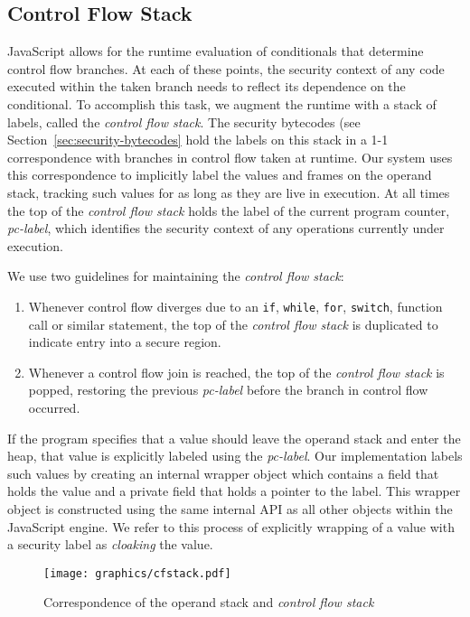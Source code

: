 \documentclass{llncs}
\begin{document}
\subsection{Control Flow Stack}
\label{sec:control-flow-stack}
JavaScript allows for the runtime evaluation of conditionals that determine control flow branches.
At each of these points, the security context of any code executed within the taken branch needs to reflect its dependence on the conditional.
To accomplish this task, we augment the runtime with a stack of labels, called the \textit{control flow stack}.
The security bytecodes (see Section~\ref{sec:security-bytecodes} hold the labels on this stack in a 1-1 correspondence with branches in control flow taken at runtime.
Our system uses this correspondence to implicitly label the values and frames on the operand stack, tracking such values for as long as they are live in execution.
At all times the top of the \textit{control flow stack} holds the label of the current program counter, \textit{pc-label}, which identifies the security context of any operations currently under execution.

We use two guidelines for maintaining the \textit{control flow stack}:
\begin{enumerate}
 \item Whenever control flow diverges due to an \texttt{if}, \texttt{while}, \texttt{for}, \texttt{switch}, function call or similar statement, the top of the \textit{control flow stack} is duplicated to indicate entry into a secure region.
 \item Whenever a control flow join is reached, the top of the \textit{control flow stack} is popped, restoring the previous \textit{pc-label} before the branch in control flow occurred.
\end{enumerate}

If the program specifies that a value should leave the operand stack and enter the heap, that value is explicitly labeled using the \textit{pc-label}.
Our implementation labels such values by creating an internal wrapper object which contains a field that holds the value and a private field that holds a pointer to the label.
This wrapper object is constructed using the same internal API as all other objects within the JavaScript engine.
We refer to this process of explicitly wrapping of a value with a security label as \textit{cloaking} the value.

\begin{figure}[ht]
  \centerline{\texttt{[image: graphics/cfstack.pdf]}}
  \caption{Correspondence of the operand stack and \textit{control flow stack}}
  \label{fig:cfstack}
\end{figure}
\end{document}
